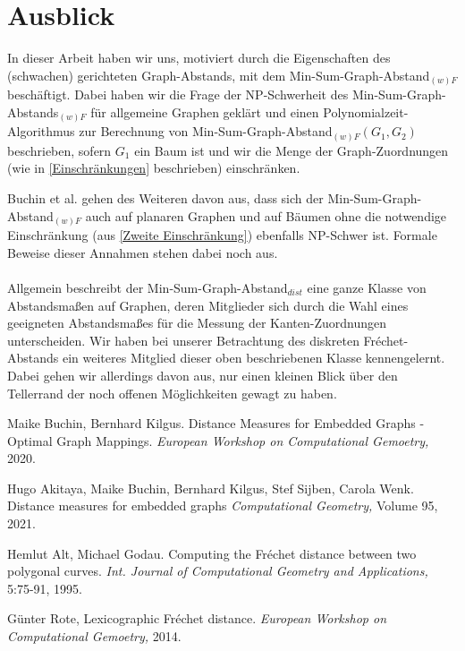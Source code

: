 \documentclass[a4paper, 12pt, twoside]{article}
\theoremstyle{Format1} %
\begin{document}
\section{Ausblick}
In dieser Arbeit haben wir uns, motiviert durch die Eigenschaften des (schwachen) gerichteten Graph-Abstands, mit dem
Min-Sum-Graph-Abstand$_{(w)F}$ beschäftigt. Dabei haben wir die Frage der NP-Schwerheit des Min-Sum-Graph-Abstands$_{(w)F}$ für allgemeine
Graphen geklärt und einen Polynomialzeit-Algorithmus zur Berechnung von Min-Sum-Graph-Abstand$_{(w)F}(G_1, G_2)$ beschrieben, sofern $G_1$ ein Baum ist
und wir die Menge der Graph-Zuordnungen (wie in \ref{Einschränkungen} beschrieben) einschränken.

Buchin et al. gehen des Weiteren davon aus, dass sich der Min-Sum-Graph-Abstand$_{(w)F}$ auch auf planaren Graphen und
auf Bäumen ohne die notwendige Einschränkung (aus \ref{Zweite Einschränkung}) ebenfalls NP-Schwer ist.
Formale Beweise dieser Annahmen stehen dabei noch aus.
\\
\\
Allgemein beschreibt der Min-Sum-Graph-Abstand$_{dist}$ eine ganze Klasse von Abstandsmaßen auf Graphen, deren Mitglieder sich durch die Wahl
eines geeigneten Abstandsmaßes für die Messung der Kanten-Zuordnungen unterscheiden.
Wir haben bei unserer Betrachtung des diskreten Fréchet-Abstands ein weiteres Mitglied dieser oben beschriebenen Klasse kennengelernt.
Dabei gehen wir allerdings davon aus, nur einen kleinen Blick über den Tellerrand der noch offenen Möglichkeiten gewagt zu haben.
\newpage\null\thispagestyle{empty}\newpage

\begin{thebibliography}{4}
		Maike Buchin, Bernhard Kilgus. Distance Measures for Embedded Graphs - Optimal Graph Mappings.
		\textit{European Workshop on Computational Gemoetry,} 2020.

		Hugo Akitaya, Maike Buchin, Bernhard Kilgus, Stef Sijben, Carola Wenk. Distance measures for embedded graphs
		\textit{Computational Geometry,} Volume 95, 2021.

		Hemlut Alt, Michael Godau. Computing the Fréchet distance between two polygonal curves.
		\textit{Int. Journal of Computational Geometry and Applications,} 5:75-91, 1995.

		Günter Rote, Lexicographic Fréchet distance.
		\textit{European Workshop on Computational Gemoetry,} 2014.

\end{thebibliography}


\end{document}
